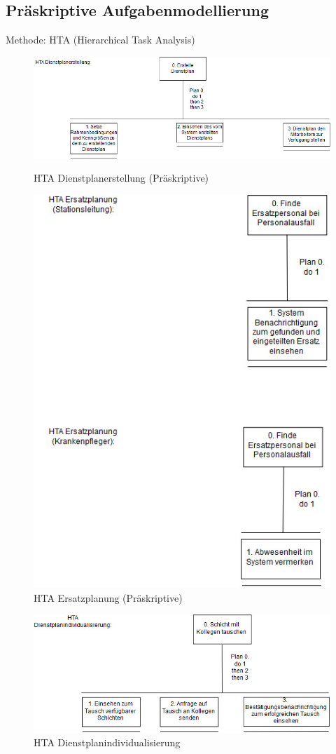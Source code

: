 \documentclass[10pt,a4paper]{article}
\begin{document}
\subsection{Präskriptive Aufgabenmodellierung}
Methode: HTA (Hierarchical Task Analysis)
\begin{figure}[H]
\includegraphics[scale=0.45]{Bilder/DPerstellung.jpg}{\centering}
\caption{HTA Dienstplanerstellung (Präskriptive)}
\vspace{3cm}
\includegraphics[scale=0.55]{Bilder/ersatzplanungP.jpg}{\centering}
\caption{HTA Ersatzplanung (Präskriptive)}
\vspace{3cm}
\end{figure}
\begin{figure}[h]
\includegraphics[scale=0.5]{Bilder/IndiPraes.jpg}{\centering}
\caption{HTA Dienstplanindividualisierung}
\end{figure}
\end{document}
